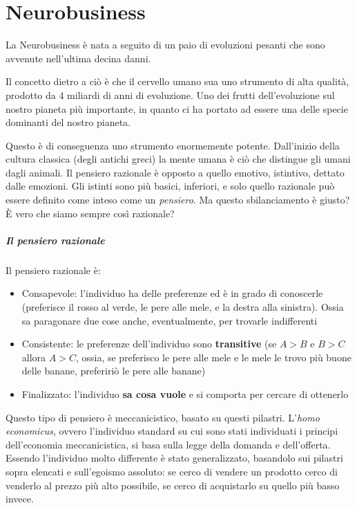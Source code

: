 \chapter{Neurobusiness}

La Neurobusiness è nata a seguito di un paio di evoluzioni pesanti che sono
avvenute nell'ultima decina danni.

Il concetto dietro a ciò è che il cervello umano sua uno strumento di alta
qualità, prodotto da 4 miliardi di anni di evoluzione. Uno dei frutti
dell'evoluzione sul nostro pianeta più importante, in quanto ci ha portato ad
essere una delle specie dominanti del nostro pianeta.

Questo è di conseguenza uno strumento enormemente potente. Dall'inizio della
cultura classica (degli antichi greci) la mente umana è ciò che distingue gli
umani dagli animali. Il pensiero razionale è opposto a quello emotivo,
istintivo, dettato dalle emozioni. Gli istinti sono più basici, inferiori, e
solo quello razionale può essere definito come inteso come un \textit{pensiero}.
Ma questo sbilanciamento è giusto? È vero che siamo sempre così razionale?

\paragraph*{Il pensiero razionale} Il pensiero razionale è:
\begin{itemize}
 \item Consapevole: l'individuo ha delle preferenze ed è in grado di conoscerle
(preferisce il rosso al verde, le pere alle mele, e la destra alla sinistra).
Ossia sa paragonare due cose anche, eventualmente, per trovarle indifferenti
 \item Consistente: le preferenze dell'individuo sono \textbf{transitive} (se $A
> B$ e $B > C$ allora $A > C$, ossia, se preferisco le pere alle mele e le mele
le trovo più buone delle banane, prefeririò le pere alle banane)
 \item Finalizzato: l'individuo \textbf{sa cosa vuole} e si comporta per
cercare di ottenerlo
\end{itemize}

Questo tipo di pensiero è meccanicistico, basato su questi pilastri.
L'\textit{homo economicus}, ovvero l'individuo standard su cui sono stati
individuati i principi dell'economia meccanicistica, si basa sulla legge della
domanda e dell'offerta.
Essendo l'individuo molto differente è stato generalizzato, basandolo sui
pilastri sopra elencati e sull'egoismo assoluto: se cerco di vendere un
prodotto cerco di venderlo al prezzo più alto possibile, se cerco di
acquistarlo su quello più basso invece.

